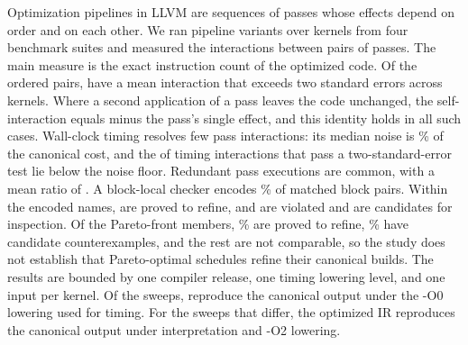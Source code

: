 Optimization pipelines in LLVM are sequences of passes whose effects depend on order and on each other. We ran \NumSweeps{} pipeline variants over \NumKernels{} kernels from four benchmark suites and measured the interactions between pairs of \NumThreePasses{} passes. The main measure is the exact instruction count of the optimized code. Of the \InstInteractionCells{} ordered pairs, \InstInteractionConsistentCells{} have a mean interaction that exceeds two standard errors across kernels. Where a second application of a pass leaves the code unchanged, the self-interaction equals minus the pass's single effect, and this identity holds in all \InstSelfIdentityCases{} such cases. Wall-clock timing resolves few pass interactions: its median noise is \NoiseMedianAbsPct{}\% of the canonical cost, and the \InteractionSignificantCells{} of \InteractionCells{} timing interactions that pass a two-standard-error test lie below the noise floor. Redundant pass executions are common, with a mean ratio of \RpbOverallMean{}. A block-local checker encodes \BlocksEncodablePct{}\% of matched block pairs. Within the encoded names, \NamesRefine{} are proved to refine, and \NamesViolated{} are violated and are candidates for inspection. Of the Pareto-front members, \ParetoMemberUnsatPct{}\% are proved to refine, \ParetoMemberSatPct{}\% have candidate counterexamples, and the rest are not comparable, so the study does not establish that Pareto-optimal schedules refine their canonical builds. The results are bounded by one compiler release, one timing lowering level, and one input per kernel. Of the \OutputsChecked{} sweeps, \OutputsAgreeing{} reproduce the canonical output under the -O0 lowering used for timing. For the \OutputsDiffering{} sweeps that differ, the optimized IR reproduces the canonical output under interpretation and -O2 lowering.
